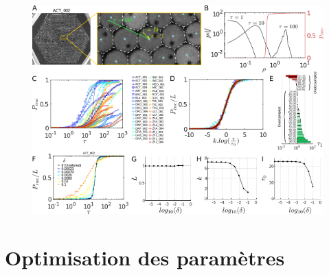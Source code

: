     \begin{figure}[h!]
    \centering
    \includegraphics[width=1\textwidth]{part_1/assets/Figure_3.png}
    \caption{\textbf{}}
    \label{part_1:fig_3}
    \end{figure}


	\section{Optimisation des paramètres}
	

